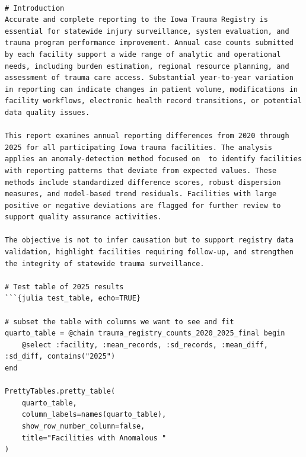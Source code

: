\documentclass[
  12pt,
  letterpaper,
  DIV=11,
  numbers=noendperiod]{scrartcl}
\begin{document}
\begin{verbatim}

# Introduction
Accurate and complete reporting to the Iowa Trauma Registry is essential for statewide injury surveillance, system evaluation, and trauma program performance improvement. Annual case counts submitted by each facility support a wide range of analytic and operational needs, including burden estimation, regional resource planning, and assessment of trauma care access. Substantial year‑to‑year variation in reporting can indicate changes in patient volume, modifications in facility workflows, electronic health record transitions, or potential data quality issues.

This report examines annual reporting differences from 2020 through 2025 for all participating Iowa trauma facilities. The analysis applies an anomaly‑detection method focused on  to identify facilities with reporting patterns that deviate from expected values. These methods include standardized difference scores, robust dispersion measures, and model‑based trend residuals. Facilities with large positive or negative deviations are flagged for further review to support quality assurance activities.

The objective is not to infer causation but to support registry data validation, highlight facilities requiring follow‑up, and strengthen the integrity of statewide trauma surveillance.

# Test table of 2025 results
```{julia test_table, echo=TRUE}

# subset the table with columns we want to see and fit
quarto_table = @chain trauma_registry_counts_2020_2025_final begin
    @select :facility, :mean_records, :sd_records, :mean_diff, :sd_diff, contains("2025")
end

PrettyTables.pretty_table(
    quarto_table,
    column_labels=names(quarto_table),
    show_row_number_column=false,
    title="Facilities with Anomalous "
)
\end{verbatim}
\end{document}
